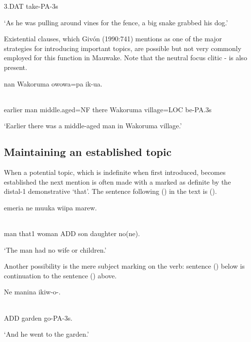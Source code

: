 3.DAT  take-PA-3s

`As he was pulling around vines for the fence, a big snake grabbed his dog.'

Existential clauses, which Giv\'on (1990:741) mentions as one of the major strategies for introducing important topics, are possible but not very commonly employed for this function in Mauwake. Note that the neutral focus clitic - is also present.

\ea%
\label{ex:x1672}
\gll {}    nan  Wakoruma  owowa=pa  ik-ua. \\
      \\
\glt
\z

earlier  man  middle.aged=NF  there  Wakoruma  village=LOC  be-PA.3s

`Earlier there was a middle-aged man in Wakoruma village.'

\subsection{Maintaining an established topic} 
\hypertarget{RefHeading23841935131865}{}
When a potential topic, which is indefinite when first introduced, becomes established the next mention is often made with a  marked as definite by the distal-1 demonstrative  `that'. The sentence  following () in the text is (). 

\ea%
\label{ex:x1673}
\gll {}  emeria  ne  muuka  wiipa  marew. \\
      \\
\glt
\z

man  that1  woman  ADD  son  daughter  no(ne).

`The man had no wife or children.'

Another possibility is the mere subject marking on the verb: sentence () below is continuation to the sentence () above. 

\ea%
\label{ex:x1674}
\gll Ne  manina  ikiw-o-. \\
      \\
\glt
\z

ADD  garden  go-PA-3s.

`And he went to the garden.'

